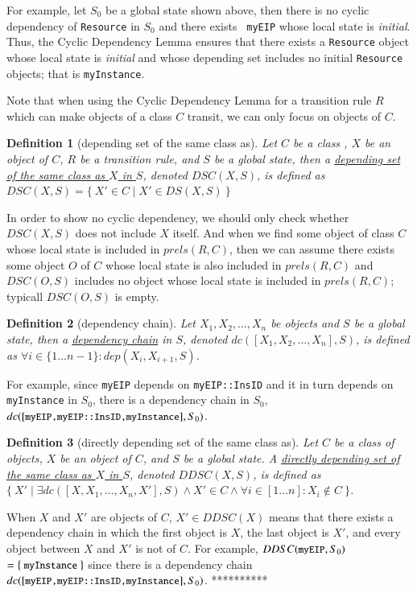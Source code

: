 \documentclass[12pt]{report}
\newtheorem{definition}{Definition}
\newcommand{\mbstt}[1]{\mbox{\small{\tt {#1}}}}
\newcommand{\ul}{\underline}
\begin{document}
\noindent
For example, let $S_0$ be a global state shown above, then there is no
cyclic dependency of {\tt Resource} in $S_0$ and there exists {\tt
  myEIP} whose local state is {\it initial}. Thus, the Cyclic
Dependency Lemma ensures that there exists a {\tt Resource} object
whose local state is {\it initial} and whose depending set includes no
initial {\tt Resource} objects; that is {\tt myInstance}.

Note that when using the Cyclic Dependency Lemma for a transition rule
$R$ which can make objects of a class $C$ transit, we can only focus
on objects of $C$.
\begin{definition}[depending set of the same class as]
Let $C$ be a class , $X$ be an object of $C$, $R$ be a transition
rule, and $S$ be a global state, then a \ul{depending set of the same
class as $X$ in $S$}, denoted \ul{$DSC(X,S)$}, is defined
as $DSC(X,S)=\{~X'\in C\mid X'\in DS(X,S)~\}$
\end{definition}
In order to show no cyclic dependency, we should only check whether
$DSC(X,S)$ does not include $X$ itself. And when we find some object
of class $C$ whose local state is included in $prels(R,C)$, then we can
assume there exists some object $O$ of $C$ whose local state is also
included in $prels(R,C)$ and $DSC(O,S)$ includes no object whose local
state is included in $prels(R,C)$; typicall $DSC(O,S)$ is empty.

\begin{definition}[dependency chain]
Let $X_1, X_2, \dots,X_n$ be objects and $S$ be a global state, then a
\ul{dependency chain} in $S$, denoted \ul{$dc([X_1, X_2,\dots,
    X_n],S)$}, is defined as $\forall i \in \{1 \dots n-1\} : dep(X_i,
X_{i+1},S)$.
\end{definition}
For example, since {\tt myEIP} depends on {\tt myEIP::InsID} and it in
turn depends on {\tt myInstance} in $S_0$, there is a dependency chain
in $S_0$, $dc([\mbstt{myEIP,myEIP::InsID,myInstance}],S_0)$.

\begin{definition}[directly depending set of the same class as]
Let $C$ be a class of objects, $X$ be an object of $C$, and $S$ be a
global state. A \ul{directly depending set of the same class as
  $X$ in $S$}, denoted \ul{$DDSC(X,S)$}, is defined as
$\{~X'\mid\exists dc([X,X_1,\dots,X_n,X'],S)\land X' \in C\land\forall
i\in [1 \dots n]:X_i \not\in C~\}$.
\end{definition}
When $X$ and $X'$ are objects of $C$, $X' \in DDSC(X)$ means that
there exists a dependency chain in which the first object is $X$, the
last object is $X'$, and every object between $X$ and $X'$ is not of
$C$. For example, $DDSC(\mbstt{myEIP},S_0)$ $=\{~\mbstt{myInstance}~\}$
since there is a dependency chain
$dc([\mbstt{myEIP,myEIP::InsID,myInstance}],S_0)$.
**********
\end{document}
